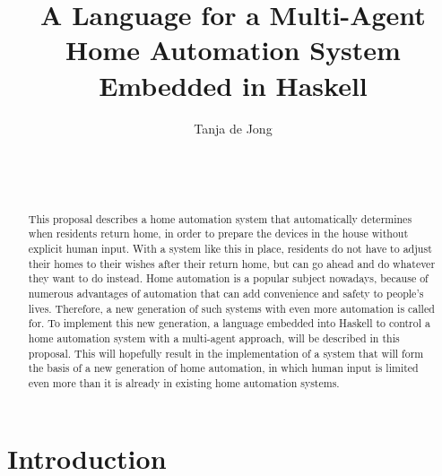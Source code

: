 \documentclass{sig-alternate-br}
\begin{document}

\title{A Language for a Multi-Agent Home Automation System  Embedded in Haskell}

\author{
\alignauthor
Tanja de Jong\\
       \\
       \\
       \\
}

\maketitle
\begin{abstract}
This proposal describes a home automation system that automatically determines when residents return home, in order to prepare the devices in the house without explicit human input. With a system like this in place, residents do not have to adjust their homes to their wishes after their return home, but can go ahead and do whatever they want to do instead.
Home automation is a popular subject nowadays, because of numerous advantages of automation that can add convenience and safety to people's lives. Therefore, a new generation of such systems with even more automation is called for.
To implement this new generation, a language embedded into Haskell to control a home automation system with a multi-agent approach, will be described in this proposal.
This will hopefully result in the implementation of a system that will form the basis of a new generation of home automation, in which human input is limited even more than it is already in existing home automation systems.
\end{abstract}



\section{Introduction}
\end{document}
